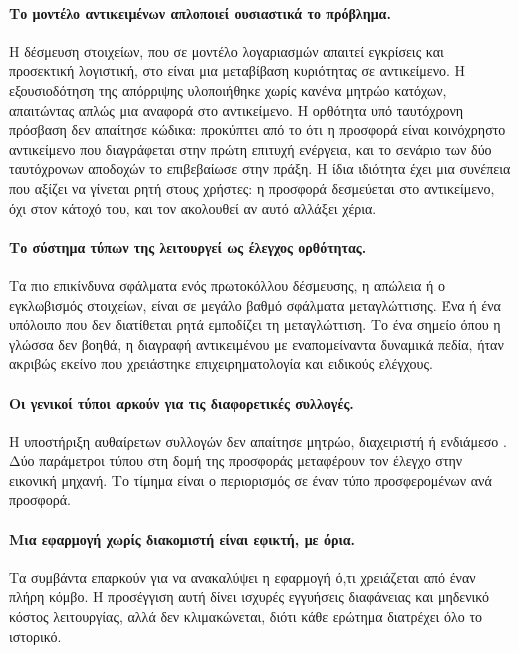 \paragraph{Το μοντέλο αντικειμένων απλοποιεί ουσιαστικά το πρόβλημα.} Η δέσμευση
στοιχείων, που σε μοντέλο λογαριασμών απαιτεί εγκρίσεις και προσεκτική λογιστική, στο
 είναι μια μεταβίβαση κυριότητας σε αντικείμενο. Η εξουσιοδότηση της απόρριψης
υλοποιήθηκε χωρίς κανένα μητρώο κατόχων, απαιτώντας απλώς μια αναφορά στο αντικείμενο. Η
ορθότητα υπό ταυτόχρονη πρόσβαση δεν απαίτησε κώδικα: προκύπτει από το ότι η προσφορά
είναι κοινόχρηστο αντικείμενο που διαγράφεται στην πρώτη επιτυχή ενέργεια, και το σενάριο
των δύο ταυτόχρονων αποδοχών το επιβεβαίωσε στην πράξη. Η ίδια ιδιότητα έχει μια συνέπεια
που αξίζει να γίνεται ρητή στους χρήστες: η προσφορά δεσμεύεται στο αντικείμενο, όχι στον
κάτοχό του, και τον ακολουθεί αν αυτό αλλάξει χέρια.

\paragraph{Το σύστημα τύπων της  λειτουργεί ως έλεγχος ορθότητας.} Τα πιο
επικίνδυνα σφάλματα ενός πρωτοκόλλου δέσμευσης, η απώλεια ή ο εγκλωβισμός στοιχείων, είναι
σε μεγάλο βαθμό σφάλματα μεταγλώττισης. Ένα  ή ένα υπόλοιπο που δεν διατίθεται
ρητά εμποδίζει τη μεταγλώττιση. Το ένα σημείο όπου η γλώσσα δεν βοηθά, η διαγραφή
αντικειμένου με εναπομείναντα δυναμικά πεδία, ήταν ακριβώς εκείνο που χρειάστηκε
επιχειρηματολογία και ειδικούς ελέγχους.

\paragraph{Οι γενικοί τύποι αρκούν για τις διαφορετικές συλλογές.} Η υποστήριξη
αυθαίρετων συλλογών δεν απαίτησε μητρώο, διαχειριστή ή ενδιάμεσο . Δύο
παράμετροι τύπου στη δομή της προσφοράς μεταφέρουν τον έλεγχο στην εικονική μηχανή. Το
τίμημα είναι ο περιορισμός σε έναν τύπο προσφερομένων ανά προσφορά.

\paragraph{Μια εφαρμογή χωρίς διακομιστή είναι εφικτή, με όρια.} Τα συμβάντα επαρκούν για
να ανακαλύψει η εφαρμογή ό,τι χρειάζεται από έναν πλήρη κόμβο. Η προσέγγιση αυτή δίνει
ισχυρές εγγυήσεις διαφάνειας και μηδενικό κόστος λειτουργίας, αλλά δεν κλιμακώνεται, διότι
κάθε ερώτημα διατρέχει όλο το ιστορικό.

